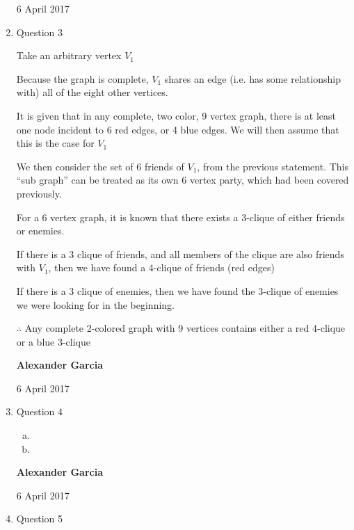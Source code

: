 \documentclass[11pt]{article}
\begin{document}
\begin{enumerate}
		6 April 2017 \\

	\item Question 3

		Take an arbitrary vertex $V_1$

		Because the graph is complete, $V_1$ shares an edge (i.e. has some
		relationship with) all of the eight other vertices.

		It is given that in any complete, two color, 9 vertex graph, there is
		at least one node incident to 6 red edges, or 4 blue edges. We will
		then assume that this is the case for $V_1$

		We then consider the set of 6 friends of $V_1$, from the previous
		statement. This ``sub graph'' can be treated as its own 6 vertex
		party, which had been covered previously.

		For a 6 vertex graph, it is known that there exists a 3-clique of either
		friends or enemies.

		If there is a 3 clique of friends, and all members of the clique are also
		friends with $V_1$, then we have found a 4-clique of friends (red edges)

		If there is a 3 clique of enemies, then we have found the 3-clique of enemies
		we were looking for in the beginning.

		$\therefore$ Any complete 2-colored graph with 9 vertices contains either a
		red 4-clique or a blue 3-clique \\

		\newpage

		\textbf{Alexander Garcia}

		6 April 2017 \\

	\item Question 4

		\begin{enumerate}[(a)]

			\item

			\item

		\end{enumerate}

		\newpage

		\textbf{Alexander Garcia}

		6 April 2017 \\

	\item Question 5

		\begin{enumerate}[(a)]


\end{enumerate}
\end{enumerate}
\end{document}
